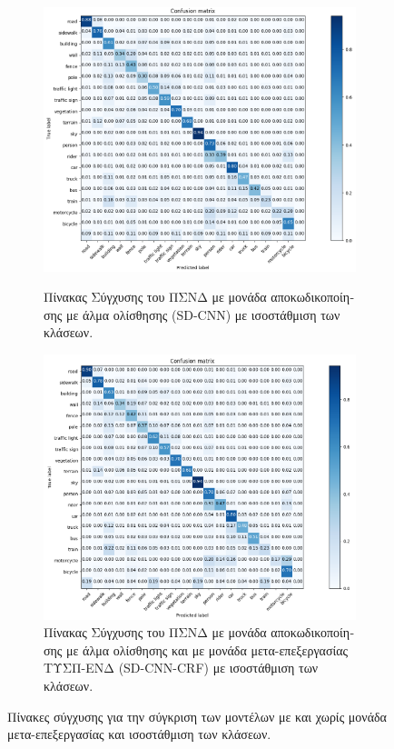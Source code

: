 \begin{figure}[H]
\centering
\begin{subfigure}[b]{1\linewidth}
 \includegraphics[scale=0.36]{Images/final_CF_7} \\[1pt]
 \caption{\textgreek{Πίνακας Σύγχυσης του ΠΣΝΔ με μονάδα αποκωδικοποίησης με άλμα ολίσθησης} (SD-CNN)\textgreek{ με ισοστάθμιση των κλάσεων.}}
 \end{subfigure}
\begin{subfigure}[b]{1\linewidth}
\includegraphics[scale=0.36]{Images/final_CF_7_CRF5}
\caption{\textgreek{Πίνακας Σύγχυσης του ΠΣΝΔ με μονάδα αποκωδικοποίησης με άλμα ολίσθησης και με μονάδα μετα-επεξεργασίας ΤΥΣΠ-ΕΝΔ} (SD-CNN-CRF)\textgreek{ με ισοστάθμιση των κλάσεων.}}
\end{subfigure}
\caption[\textgreek{Πίνακες Σύγχυσης με ΤΥΣΠ-ΕΝΔ}]{\textgreek{Πίνακες σύγχυσης για την σύγκριση των μοντέλων με και χωρίς μονάδα μετα-επεξεργασίας και ισοστάθμιση των κλάσεων.}}\label{fig:cf_2}
\end{figure}
